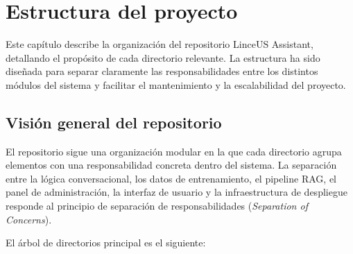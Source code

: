 
\chapter{Estructura del proyecto}\label{cap:estructura-proyecto}

Este capítulo describe la organización del repositorio LinceUS Assistant, detallando el propósito de cada directorio relevante. La estructura ha sido diseñada para separar claramente las responsabilidades entre los distintos módulos del sistema y facilitar el mantenimiento y la escalabilidad del proyecto.

\section{Visión general del repositorio}\label{sec:vision-general}

El repositorio sigue una organización modular en la que cada directorio agrupa elementos con una responsabilidad concreta dentro del sistema. La separación entre la lógica conversacional, los datos de entrenamiento, el pipeline RAG, el panel de administración, la interfaz de usuario y la infraestructura de despliegue responde al principio de separación de responsabilidades (\textit{Separation of Concerns}).

El árbol de directorios principal es el siguiente:

